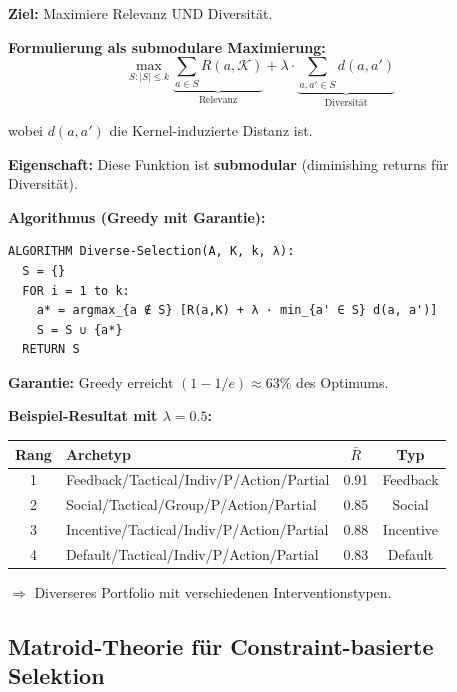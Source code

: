 \begin{tcolorbox}[colback=green!5!white, colframe=green!75!black,
    title=\textbf{Theorem HHH-T12: Diversitäts-maximierende Selektion}]

\textbf{Ziel:} Maximiere Relevanz UND Diversität.

\textbf{Formulierung als submodulare Maximierung:}
\begin{equation}
\max_{S: |S| \leq k} \underbrace{\sum_{a \in S} R(a, \mathcal{K})}_{\text{Relevanz}} + \lambda \cdot \underbrace{\sum_{a, a' \in S} d(a, a')}_{\text{Diversität}}
\end{equation}

wobei $d(a, a')$ die Kernel-induzierte Distanz ist.

\textbf{Eigenschaft:} Diese Funktion ist \textbf{submodular} (diminishing returns für Diversität).

\textbf{Algorithmus (Greedy mit Garantie):}
\begin{verbatim}
ALGORITHM Diverse-Selection(A, K, k, λ):
  S = {}
  FOR i = 1 to k:
    a* = argmax_{a ∉ S} [R(a,K) + λ · min_{a' ∈ S} d(a, a')]
    S = S ∪ {a*}
  RETURN S
\end{verbatim}

\textbf{Garantie:} Greedy erreicht $(1 - 1/e) \approx 63\%$ des Optimums.

\textbf{Beispiel-Resultat mit $\lambda = 0.5$:}
\begin{center}
\begin{tabular}{@{}clcc@{}}
\toprule
\textbf{Rang} & \textbf{Archetyp} & $\bar{R}$ & \textbf{Typ} \\
\midrule
1 & Feedback/Tactical/Indiv/P/Action/Partial & 0.91 & Feedback \\
2 & Social/Tactical/Group/P/Action/Partial & 0.85 & Social \\
3 & Incentive/Tactical/Indiv/P/Action/Partial & 0.88 & Incentive \\
4 & Default/Tactical/Indiv/P/Action/Partial & 0.83 & Default \\
\bottomrule
\end{tabular}
\end{center}

$\Rightarrow$ Diverseres Portfolio mit verschiedenen Interventionstypen.

\end{tcolorbox}

\subsection{Matroid-Theorie für Constraint-basierte Selektion}

